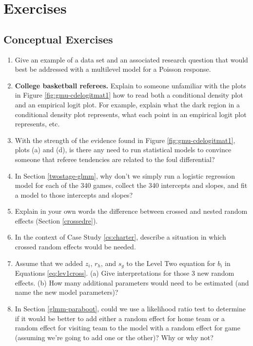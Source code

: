 \documentclass[
]{krantz}
\begin{document}
\hypertarget{exercises-10}{%
\section{Exercises}\label{exercises-10}}

\hypertarget{conceptual-exercises-8}{%
\subsection{Conceptual Exercises}\label{conceptual-exercises-8}}

\begin{enumerate}
\def\labelenumi{\arabic{enumi}.}
\item
  Give an example of a data set and an associated research question that would best be addressed with a multilevel model for a Poisson response.
\item
  \textbf{College basketball referees.} Explain to someone unfamiliar with the plots in Figure \ref{fig:gmu-cdelogitmat1} how to read both a conditional density plot and an empirical logit plot. For example, explain what the dark region in a conditional density plot represents, what each point in an empirical logit plot represents, etc.
\item
  With the strength of the evidence found in Figure \ref{fig:gmu-cdelogitmat1}, plots (a) and (d), is there any need to run statistical models to convince someone that referee tendencies are related to the foul differential?
\item
  In Section \ref{twostage-glmm}, why don't we simply run a logistic regression model for each of the 340 games, collect the 340 intercepts and slopes, and fit a model to those intercepts and slopes?
\item
  Explain in your own words the difference between crossed and nested random effects (Section \ref{crossedre}).
\item
  In the context of Case Study \ref{cs:charter}, describe a situation in which crossed random effects would be needed.
\item
  Assume that we added \(z_{i}\), \(r_{h}\), and \(s_{g}\) to the Level Two equation for \(b_{i}\) in Equations \eqref{eq:lev1cross}. (a) Give interpretations for those 3 new random effects. (b) How many additional parameters would need to be estimated (and name the new model parameters)?
\item
  In Section \ref{glmm-paraboot}, could we use a likelihood ratio test to determine if it would be better to add either a random effect for home team or a random effect for visiting team to the model with a random effect for game (assuming we're going to add one or the other)? Why or why not?

\end{enumerate}
\end{document}
